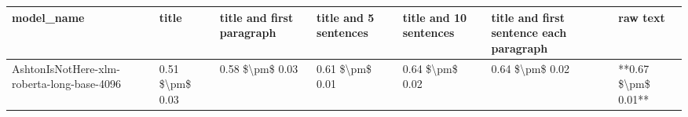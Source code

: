 \begin{tabular}{lllllll}
\toprule
                                model\_name &           title & title and first paragraph & title and 5 sentences & title and 10 sentences & title and first sentence each paragraph &            raw text \\
\midrule
AshtonIsNotHere-xlm-roberta-long-base-4096 & 0.51 \$\textbackslash pm\$ 0.03 &           0.58 \$\textbackslash pm\$ 0.03 &       0.61 \$\textbackslash pm\$ 0.01 &        0.64 \$\textbackslash pm\$ 0.02 &                         0.64 \$\textbackslash pm\$ 0.02 & **0.67 \$\textbackslash pm\$ 0.01** \\
\bottomrule
\end{tabular}

